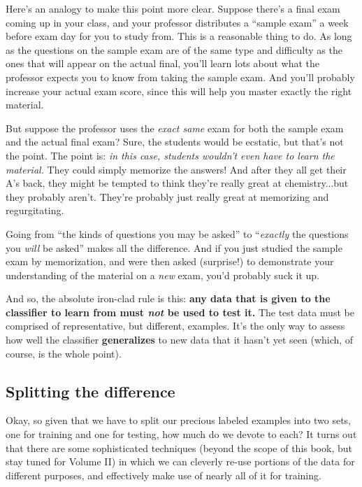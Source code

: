Here's an analogy to make this point more clear. Suppose there's a final exam
coming up in your class, and your professor distributes a ``sample exam'' a
week before exam day for you to study from. This is a reasonable thing to do.
As long as the questions on the sample exam are of the same type and difficulty
as the ones that will appear on the actual final, you'll learn lots about what
the professor expects you to know from taking the sample exam. And you'll
probably increase your actual exam score, since this will help you master
exactly the right material.

But suppose the professor uses the \textit{exact same} exam for both the sample
exam and the actual final exam? Sure, the students would be ecstatic, but
that's not the point. The point is: \textit{in this case, students wouldn't
even have to learn the material.} They could simply memorize the answers! And
after they all get their A's back, they might be tempted to think they're
really great at chemistry...but they probably aren't. They're probably just
really great at memorizing and regurgitating.

Going from ``the kinds of questions you may be asked'' to ``\textit{exactly}
the questions you \textit{will} be asked'' makes all the difference. And if you
just studied the sample exam by memorization, and were then asked (surprise!)
to demonstrate your understanding of the material on a \textit{new} exam, you'd
probably suck it up.


And so, the absolute iron-clad rule is this: \textbf{any data that is given to
the classifier to learn from must \textit{not} be used to test it.} The test
data must be comprised of representative, but different, examples. It's the
only way to assess how well the classifier \textbf{generalizes} to new data
that it hasn't yet seen (which, of course, is the whole point).


\subsection{Splitting the difference}

Okay, so given that we have to split our precious labeled examples into two
sets, one for training and one for testing, how much do we devote to each? It
turns out that there are some sophisticated techniques (beyond the scope of
this book, but stay tuned for Volume II) in which we can cleverly re-use
portions of the data for different purposes, and effectively make use of nearly
all of it for training.

